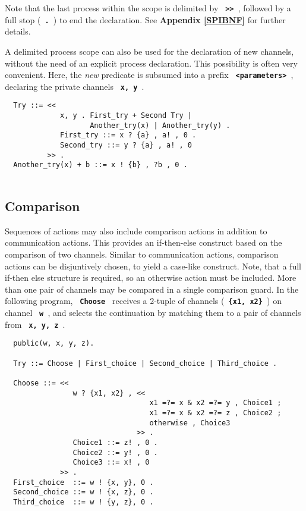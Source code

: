 \documentclass[twoside,10pt]{report}
\begin{document}
Note that the last process within the scope is delimited by {\bf \verb+ >> +},
followed by a full stop ({\bf \verb+ . +}) to end the declaration.  See
{\bf Appendix \ref{SPIBNF}} for further details.

A delimited process scope can also be used for the declaration of
new channels, without the need of an explicit process declaration.
This possibility is often very convenient. Here, the
{\em new} predicate is subsumed into a prefix
{\bf \verb+ <parameters> +}, declaring the private channels
{\bf \verb+ x, y +}.

\begin{verbatim}
  Try ::= <<
             x, y . First_try + Second Try |
                    Another_try(x) | Another_try(y) .
             First_try ::= x ? {a} , a! , 0 .
             Second_try ::= y ? {a} , a! , 0 
          >> .
  Another_try(x) + b ::= x ! {b} , ?b , 0 .
 
\end{verbatim}

\subsection{Comparison}

Sequences of actions may also include comparison actions in
addition to communication actions. This provides an if-then-else construct
based on the comparison of two channels. Similar to communication
actions, comparison actions can be disjuntively chosen, to yield a
case-like construct. Note, that a full if-then else structure is
required, so an otherwise action must be included. More than one pair
of channels may be compared in a single comparison guard. In the following
program, {\bf \verb+ Choose +} receives a 2-tuple of channels
({\bf \verb+ {x1, x2} +})
on channel {\bf \verb+ w +}, and selects the continuation by matching them
to a pair of channels from {\bf \verb+ x, y, z +}.

\begin{verbatim}
  public(w, x, y, z).

  Try ::= Choose | First_choice | Second_choice | Third_choice .

  Choose ::= <<
                w ? {x1, x2} , <<
                                  x1 =?= x & x2 =?= y , Choice1 ;
                                  x1 =?= x & x2 =?= z , Choice2 ;
                                  otherwise , Choice3
                               >> .
                Choice1 ::= z! , 0 .
                Choice2 ::= y! , 0 . 
                Choice3 ::= x! , 0
             >> .
  First_choice  ::= w ! {x, y}, 0 .
  Second_choice ::= w ! {x, z}, 0 .
  Third_choice  ::= w ! {y, z}, 0 .  
 
\end{verbatim}
\end{document}

